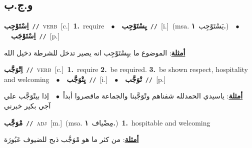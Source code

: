 \documentclass[10pt,a4paper,twoside]{article} %
\begin{document}
\begin{multicols}{2}
{{{{{{{\vspace{-3mm}
\subsection*{\color{blue}\foreignlanguage{arabic}{و.ج.ب}\color{blue}{}} 

{\setlength\topsep{0pt}\textbf{\foreignlanguage{arabic}{اِسْتَوْجِب}}\ {\color{gray}\texttt{//}\color{black}}\ \textsc{verb}\ [c.]\ \textbf{1.}~require\ \ $\bullet$\ \ \setlength\topsep{0pt}\textbf{\foreignlanguage{arabic}{يِسْتَوْجِب}}\ {\color{gray}\texttt{//}\color{black}}\ [i.]\ \color{gray}(msa. \foreignlanguage{arabic}{يَسْتَوْجِب}~\foreignlanguage{arabic}{\textbf{١.}})\color{black}\ \ $\bullet$\ \ \setlength\topsep{0pt}\textbf{\foreignlanguage{arabic}{اِسْتَوْجَب}}\ {\color{gray}\texttt{//}\color{black}}\ [p.]\  \begin{flushright}\color{gray}\foreignlanguage{arabic}{\textbf{\underline{\foreignlanguage{arabic}{أمثلة}}}: الموضوع ما بيِسْتَوْجِب انه يصير تدخل للشرطة دخيل الله}\end{flushright}\color{black}} \vspace{2mm}

{\setlength\topsep{0pt}\textbf{\foreignlanguage{arabic}{اِتْوَجَّب}}\ {\color{gray}\texttt{//}\color{black}}\ \textsc{verb}\ [c.]\ \textbf{1.}~require  \textbf{2.}~be required.  \textbf{3.}~be shown respect, hospitality and welcoming\ \ $\bullet$\ \ \setlength\topsep{0pt}\textbf{\foreignlanguage{arabic}{يِتْوَجَّب}}\ {\color{gray}\texttt{//}\color{black}}\ [i.]\ \ $\bullet$\ \ \setlength\topsep{0pt}\textbf{\foreignlanguage{arabic}{تْوَجَّب}}\ {\color{gray}\texttt{//}\color{black}}\ [p.]\  \begin{flushright}\color{gray}\foreignlanguage{arabic}{\textbf{\underline{\foreignlanguage{arabic}{أمثلة}}}: ياسيدي الحمدلله شفناهم وتْوَجَّبنا والجماعة ماقصروا أبداً\ $\bullet$\ \  إذا بيتْوَجَّب علي آجي بكير خبرني}\end{flushright}\color{black}} \vspace{2mm}

{\setlength\topsep{0pt}\textbf{\foreignlanguage{arabic}{مْوَجَّب}}\ {\color{gray}\texttt{//}\color{black}}\ \textsc{adj}\ [m.]\ \color{gray}(msa. \foreignlanguage{arabic}{مِضْياف}~\foreignlanguage{arabic}{\textbf{١.}})\color{black}\ \textbf{1.}~hospitable and welcoming\  \begin{flushright}\color{gray}\foreignlanguage{arabic}{\textbf{\underline{\foreignlanguage{arabic}{أمثلة}}}: من كثر ما هو مْوَجَّب ذبح للضيوف عَبُورَة}\end{flushright}\color{black}} \vspace{2mm}

}}}}}}}
\end{multicols}
\end{document}
